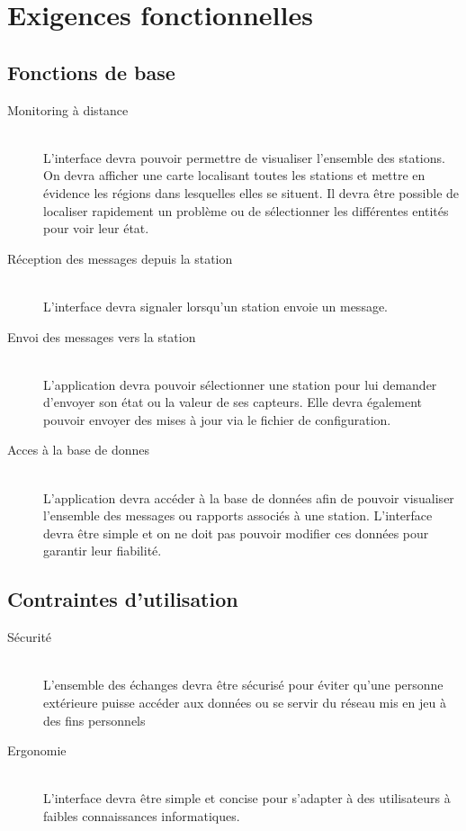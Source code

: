 
\section{Exigences fonctionnelles}

\subsection{Fonctions de base}

\begin{description}
	\item[ Monitoring à distance]\hfill\\
		L'interface devra pouvoir permettre de visualiser l'ensemble des stations. On devra afficher une carte localisant toutes les stations et mettre en évidence les régions dans lesquelles elles se situent. Il devra être possible de localiser rapidement un problème ou de sélectionner les différentes entités pour voir leur état.\\

	\item [Réception des messages depuis la station]\hfill\\
		L'interface devra signaler lorsqu'un station envoie un message. \\

	\item [Envoi des messages vers la station]\hfill\\
		L'application devra pouvoir sélectionner une station pour lui demander d'envoyer son état ou la valeur de ses capteurs. Elle devra également pouvoir envoyer des mises à jour via le fichier de configuration.\\

	\item [Acces à la base de donnes]\hfill\\
		L'application devra accéder à la base de données afin de pouvoir visualiser l'ensemble des messages ou rapports associés à une station. L'interface devra être simple et on ne doit pas pouvoir modifier ces données pour garantir leur fiabilité.
\end{description}


\subsection{Contraintes d'utilisation}

\begin{description}
	\item [Sécurité]\hfill\\
		L'ensemble des échanges devra être sécurisé pour éviter qu'une personne extérieure puisse accéder aux données ou se servir du réseau mis en jeu à des fins personnels\\

	\item [Ergonomie]\hfill\\
		L'interface devra être simple et concise pour s'adapter à des utilisateurs à faibles connaissances informatiques.\\
\end{description}	
	
